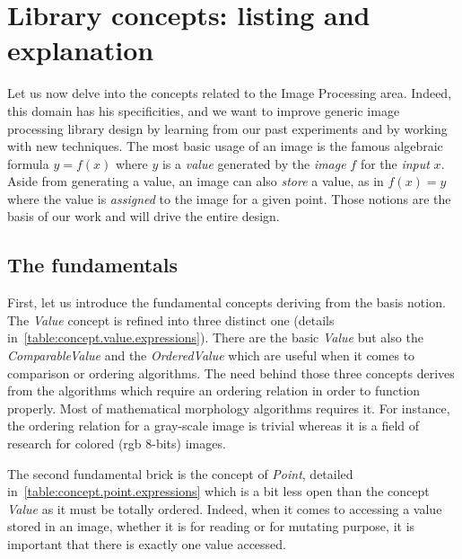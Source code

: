 \section{Library concepts: listing and explanation}
\label{sec:library.concepts}

Let us now delve into the concepts related to the Image Processing area. Indeed, this domain has his specificities, and
we want to improve generic image processing library design by learning from our past experiments and by working with new
techniques. The most basic usage of an image is the famous algebraic formula \(y = f(x)\) where \(y\) is a \emph{value}
generated by the \emph{image} \(f\) for the \emph{input} \(x\). Aside from generating a value, an image can also
\emph{store} a value, as in \(f(x) = y\) where the value is \emph{assigned} to the image for a given point. Those
notions are the basis of our work and will drive the entire design.

\subsection{The fundamentals}

\label{subsec:fundamentals}

First, let us introduce the fundamental concepts deriving from the basis notion. The \emph{Value} concept is refined
into three distinct one (details in~\cref{table:concept.value.expressions}). There are the basic \emph{Value} but also
the \emph{ComparableValue} and the \emph{OrderedValue} which are useful when it comes to comparison or ordering
algorithms. The need behind those three concepts derives from the algorithms which require an ordering relation in order
to function properly. Most of mathematical morphology algorithms requires it. For instance, the ordering relation for a
gray-scale image is trivial whereas it is a field of research for colored (rgb 8-bits) images.

The second fundamental brick is the concept of \emph{Point}, detailed in~\cref{table:concept.point.expressions} which is
a bit less open than the concept \emph{Value} as it must be totally ordered. Indeed, when it comes to accessing a value
stored in an image, whether it is for reading or for mutating purpose, it is important that there is exactly one value
accessed.

